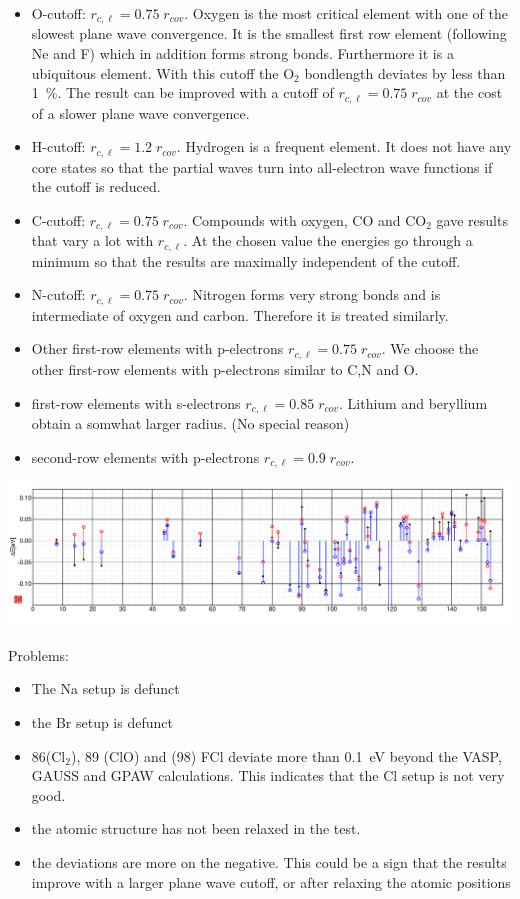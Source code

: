\documentclass{book}
\begin{document}
\begin{itemize}
\item O-cutoff: $r_{c,\ell}=0.75\;r_{cov}$. Oxygen is the most
  critical element with one of the slowest plane wave convergence. It
  is the smallest first row element (following Ne and F) which in
  addition forms strong bonds. Furthermore it is a ubiquitous
  element. With this cutoff the O$_2$ bondlength deviates by less than
  1~\%. The result can be improved with a cutoff of
  $r_{c,\ell}=0.75\;r_{cov}$ at the cost of a slower plane wave
  convergence.
%
\item H-cutoff: $r_{c,\ell}=1.2\;r_{cov}$. Hydrogen is a frequent
  element. It does not have any core states so that the partial waves
  turn into all-electron wave functions if the cutoff is reduced.
%
\item C-cutoff: $r_{c,\ell}=0.75\;r_{cov}$. Compounds with oxygen, CO
  and CO$_2$ gave results that vary a lot with $r_{c,\ell}$. At the
  chosen value the energies go through a minimum so that the results
  are maximally independent of the cutoff.
%
\item N-cutoff: $r_{c,\ell}=0.75\;r_{cov}$. Nitrogen forms very strong
  bonds and is intermediate of oxygen and carbon. Therefore it is
  treated similarly.
%
\item Other first-row elements with p-electrons
  $r_{c,\ell}=0.75\;r_{cov}$.  We choose the other first-row elements
  with p-electrons similar to C,N and O.
%
\item first-row elements with s-electrons $r_{c,\ell}=0.85\;r_{cov}$.
  Lithium and beryllium obtain a somwhat larger radius. (No special reason)
%
\item second-row elements with p-electrons $r_{c,\ell}=0.9\;r_{cov}$.
\end{itemize}

\includegraphics[width=\linewidth]{Figs/151017_Benchmark/151017_benchmark}

Problems:
\begin{itemize}
\item The Na setup is defunct
\item the Br setup is defunct
\item 86(Cl$_2$), 89 (ClO) and (98) FCl deviate more than 0.1~eV
  beyond the VASP, GAUSS and GPAW calculations. This indicates that the
  Cl setup is not very good.
\item the atomic structure has not been relaxed in the test.
\item the deviations are more on the negative. This could be a sign
  that the results improve with a larger plane wave cutoff, or after
  relaxing the atomic positions
\end{itemize}
\end{document}
